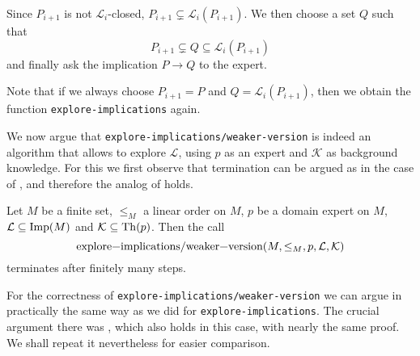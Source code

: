Since $P_{i+1}$ is not $\mathcal{L}_{i}$-closed, $P_{i+1} \subsetneq
\mathcal{L}_{i}(P_{i+1})$.  We then choose a set $Q$ such that
\begin{equation*}
  P_{i+1} \subsetneq Q \subseteq \mathcal{L}_{i}(P_{i+1})
\end{equation*}
and finally ask the implication $P \to Q$ to the expert.

Note that if we always choose $P_{i+1} = P$ and $Q = \mathcal{L}_{i}(P_{i+1})$, then we
obtain the function \lstinline{explore-implications} again.

We now argue that \lstinline{explore-implications/weaker-version} is indeed an algorithm
that allows to explore $\mathcal{L}$, using $p$ as an expert and $\mathcal{K}$ as
background knowledge.  For this we first observe that termination can be argued as in the
case of , and therefore the analog of
 holds.

\begin{Theorem}
  \label{thm:explore-implications-weaker-version-termination}
  Let $M$ be a finite set, $\leq_{M}$ a linear order on $M$, $p$ be a domain expert on
  $M$, $\mathcal{L} \subseteq \operatorname{Imp}(M)$ and $\mathcal{K} \subseteq \operatorname{Th}(p)$.  Then the call
  \begin{equation*}
    \text{\lstinline{explore-implications/weaker-version}}(M, \leq_{M}, p, \mathcal{L}, \mathcal{K})
  \end{equation*}
  terminates after finitely many steps.
\end{Theorem}

For the correctness of \lstinline{explore-implications/weaker-version} we can argue in
practically the same way as we did for \lstinline{explore-implications}.  The crucial
argument there was , which also holds
in this case, with nearly the same proof.  We shall repeat it nevertheless for easier
comparison.

